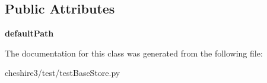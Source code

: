 \subsection*{Public Attributes}
\begin{DoxyCompactItemize}
\item 
\hypertarget{classcheshire3_1_1test_1_1test_base_store_1_1_simple_store_test_case_ab249c34651ba6aec7c4d035342f93543}{{\bfseries default\-Path}}\label{classcheshire3_1_1test_1_1test_base_store_1_1_simple_store_test_case_ab249c34651ba6aec7c4d035342f93543}

\end{DoxyCompactItemize}


The documentation for this class was generated from the following file\-:\begin{DoxyCompactItemize}
\item 
cheshire3/test/test\-Base\-Store.\-py\end{DoxyCompactItemize}
